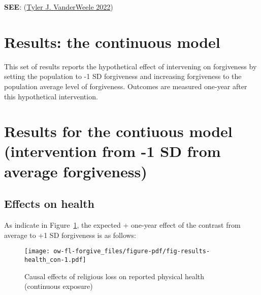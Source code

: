 \documentclass[
  singlecolumn]{report}
\begin{document}
\textbf{SEE}: (\protect\hyperlink{ref-vanderweele2022}{Tyler J.
VanderWeele 2022})

\hypertarget{results-the-continuous-model}{%
\section{Results: the continuous
model}\label{results-the-continuous-model}}

This set of results reports the hypothetical effect of intervening on
forgiveness by setting the population to -1 SD forgiveness and
increasing forgiveness to the population average level of forgiveness.
Outcomes are measured one-year after this hypothetical intervention.

\hypertarget{results-for-the-contiuous-model-intervention-from--1-sd-from-average-forgiveness}{%
\section{Results for the contiuous model (intervention from -1 SD from
average
forgiveness)}\label{results-for-the-contiuous-model-intervention-from--1-sd-from-average-forgiveness}}

\hypertarget{effects-on-health}{%
\subsection{Effects on health}\label{effects-on-health}}

As indicate in Figure~\ref{fig-results-health_con}, the expected +
one-year effect of the contrast from average to +1 SD forgiveness is as
follows:

\begin{figure}

{\centering \texttt{[image: ow-fl-forgive\_files/figure-pdf/fig-results-health\_con-1.pdf]}

}

\caption{\label{fig-results-health_con}Causal effects of religious loss
on reported physical health (continuous exposure)}

\end{figure}
\end{document}
